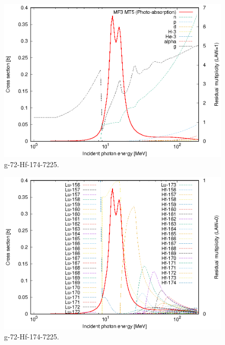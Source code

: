 \begin{figure}
 \includegraphics[width=\linewidth]{eps/g_72-Hf-174_7225.eps}
  \caption{g-72-Hf-174-7225.}
\end{figure}
\begin{figure}
 \includegraphics[width=\linewidth]{eps-law0/g_72-Hf-174_7225.eps}
 \caption{g-72-Hf-174-7225.}
\end{figure}
\newpage \clearpage

